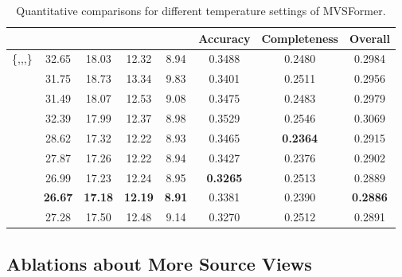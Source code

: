\documentclass[10pt]{article} \usepackage[preprint]{tmlr}
\begin{document}
\begin{table}[h]
 \caption{Quantitative comparisons for different temperature settings of MVSFormer.}
 \label{tab:appendix_ablation_t}
 \small
 \centering
\begin{tabular}{cccccccc}
\toprule 
 & {\small{}} & {\small{}} & {\small{}} & {\small{}} & {\small{}Accuracy} & {\small{}Completeness} & {\small{}Overall}\tabularnewline
\midrule 
{\small{}\{,,,\}} & {\small{}32.65} & {\small{}18.03} & {\small{}12.32} & {\small{}8.94} & {\small{}0.3488} & {\small{}0.2480} & {\small{}0.2984}\tabularnewline
{\small{}} & {\small{}31.75} & {\small{}18.73} & {\small{}13.34} & {\small{}9.83} & {\small{}0.3401} & {\small{}0.2511} & {\small{}0.2956}\tabularnewline
{\small{}} & {\small{}31.49} & {\small{}18.07} & {\small{}12.53} & {\small{}9.08} & {\small{}0.3475} & {\small{}0.2483} & {\small{}0.2979}\tabularnewline
{\small{}} & {\small{}32.39} & {\small{}17.99} & {\small{}12.37} & {\small{}8.98} & {\small{}0.3529} & {\small{}0.2546} & {\small{}0.3069}\tabularnewline
{\small{}} & {\small{}28.62} & {\small{}17.32} & {\small{}12.22} & {\small{}8.93} & {\small{}0.3465} & \textbf{\small{}0.2364} & {\small{}0.2915}\tabularnewline
{\small{}} & {\small{}27.87} & {\small{}17.26} & {\small{}12.22} & {\small{}8.94} & {\small{}0.3427} & {\small{}0.2376} & {\small{}0.2902}\tabularnewline
{\small{}} & {\small{}26.99} & {\small{}17.23} & {\small{}12.24} & {\small{}8.95} & \textbf{\small{}0.3265} & {\small{}0.2513} & {\small{}0.2889}\tabularnewline
{\small{}} & \textbf{\small{}26.67} & \textbf{\small{}17.18} & \textbf{\small{}12.19} & \textbf{\small{}8.91} & {\small{}0.3381} & {\small{}0.2390} & \textbf{\small{}0.2886}\tabularnewline
{\small{}} & {\small{}27.28} & {\small{}17.50} & {\small{}12.48} & {\small{}9.14} & {\small{}0.3270} & {\small{}0.2512} & {\small{}0.2891}\tabularnewline
\bottomrule 
\end{tabular}
\end{table}


\subsection{Ablations about More Source Views}
\label{sec:appendix_aba_of_view}
\end{document}

